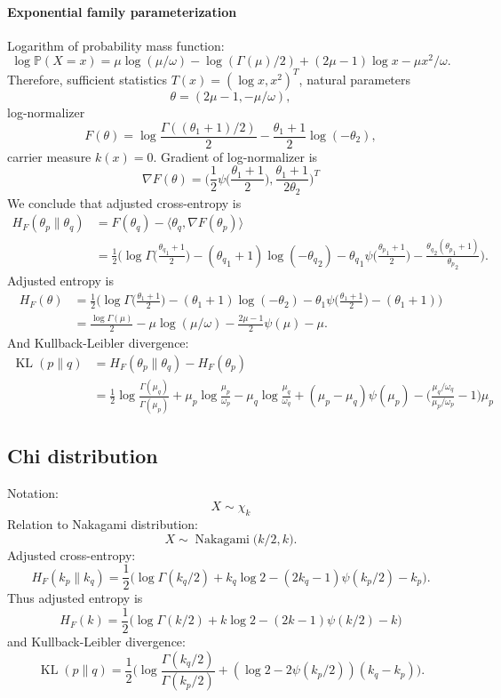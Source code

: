 \documentclass[a4paper,11pt]{article}
\theoremstyle{plain}
\theoremstyle{definition}
\newcommand{\MP}{\mathbb{P}}
\begin{document}
	\paragraph{Exponential family parameterization}
	Logarithm of probability mass function:
	\[
	\log \MP(X = x) = \mu \log (\mu / \omega) - \log(\Gamma(\mu)/2) + (2 \mu - 1) \log x - \mu x^2/\omega.
	\]
	Therefore, sufficient statistics $T(x) = (\log x, x^2)^T$, natural parameters 
	\[\theta = (2\mu-1, -\mu / \omega),\]
	log-normalizer 
	\[F(\theta) = \log \frac{\Gamma((\theta_1+1)/2)}{2} - \frac{\theta_1+1}{2} \log (-\theta_2) ,\]
	carrier measure $k(x) = 0$. Gradient of log-normalizer is 
	\[\nabla F(\theta) = \bigg(\frac{1}{2} \psi \Big(\frac{\theta_1+1}{2}\Big), \frac{\theta_1+1}{2 \theta_2} \bigg)^T\]
	We conclude that adjusted cross-entropy is
	\[
	\begin{aligned}
	H_F(\theta_p \| \theta_q) &= F(\theta_q) - \langle \theta_q, \nabla F(\theta_p) \rangle \\
	&= \frac{1}{2} \bigg( \log \Gamma\Big(\frac{{\theta_q}_1+1}{2}\Big) - ({\theta_q}_1+1) \log (-{\theta_q}_2) - {\theta_q}_1 \psi \Big(\frac{{\theta_p}_1+1}{2}\Big) - \frac{{\theta_q}_2({\theta_p}_1+1)}{{\theta_p}_2} \bigg).
	\end{aligned}
	\]
	Adjusted entropy is
	\[
	\begin{aligned}
	H_F(\theta) &= \frac{1}{2}\bigg(\log \Gamma\Big(\frac{\theta_1+1}{2}\Big) - (\theta_1+1) \log (-\theta_2) - \theta_1 \psi \Big(\frac{\theta_1+1}{2}\Big) - (\theta_1+1)\bigg) \\
	& = \frac{\log \Gamma(\mu)}{2} - \mu \log (\mu/\omega) - \frac{2\mu-1}{2} \psi(\mu) - \mu.
	\end{aligned}
	\]
	And Kullback-Leibler divergence:
	\[
	\begin{aligned}
	\operatorname{KL}(p \| q) &= H_F(\theta_p \| \theta_q) - H_F(\theta_p) \\
	&=\frac{1}{2} \log \frac{\Gamma (\mu_q)}{\Gamma(\mu_p)} + \mu_p \log\frac{\mu_p}{\omega_p} - \mu_q \log\frac{\mu_q}{\omega_q} + (\mu_p-\mu_q) \psi(\mu_p) - \bigg(\frac{\mu_q/\omega_q}{\mu_p/\omega_p} - 1\bigg)\mu_p 
	\end{aligned}
	\]
	
	
	\subsection{Chi distribution}
	Notation:
	\[
	X \sim \chi_k
	\]
	Relation to Nakagami distribution:
	\[
	X \sim \operatorname{Nakagami}\big(k/2, k\big).
	\]
	Adjusted cross-entropy:
	\[
	H_F(k_p \| k_q) = \frac{1}{2}\bigg(\log \Gamma(k_q/2) + k_q \log 2 - (2k_q-1)\psi(k_p/2) - k_p \bigg). 
	\]
	Thus adjusted entropy is
	\[
	H_F(k) = \frac{1}{2}\bigg(\log \Gamma(k/2) + k \log 2 - (2k-1)\psi(k/2) - k \bigg)
	\]
	and Kullback-Leibler divergence:
	\[
	\operatorname{KL}(p \| q) = \frac{1}{2} \bigg( \log \frac{\Gamma(k_q/2)}{\Gamma(k_p/2)} + (\log 2-2\psi(k_p/2))(k_q-k_p)\bigg).
	\]
	
\end{document}
